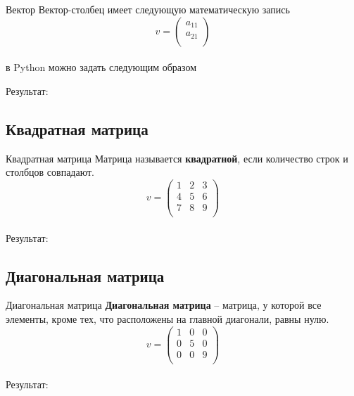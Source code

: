 \documentclass[12pt]{beamer}
\begin{document}
\begin{frame}{Вектор}
Вектор-столбец имеет следующую математическую запись
\vspace{0.2cm}
\[
  v = 
  \begin{pmatrix}
    a_{11}\\
    a_{21}\\
  \end{pmatrix}
\]
\\
\vspace{0.2cm}
в Python можно задать следующим образом
\vspace{0.2cm}

\vspace{0.2cm}
Результат: \\

\end{frame}


\subsection{Квадратная матрица}
\begin{frame}{Квадратная матрица}
Матрица называется \textbf{квадратной}, если количество строк и столбцов совпадают.
\vspace{0.2cm}
\[
  v = 
  \begin{pmatrix}
    1 & 2 & 3 \\
    4 & 5 & 6 \\
    7 & 8 & 9 \\
  \end{pmatrix}
\]
\\

Результат: \\

\end{frame}


\subsection{Диагональная матрица}
\begin{frame}{Диагональная матрица}
\textbf{Диагональная матрица} – матрица, у которой все элементы, кроме тех, что расположены на главной диагонали, равны нулю.
\vspace{0.2cm}
\[
  v = 
  \begin{pmatrix}
    1 & 0 & 0 \\
    0 & 5 & 0 \\
    0 & 0 & 9 \\
  \end{pmatrix}
\]
\\

Результат: \\

\end{frame}
\end{document}
